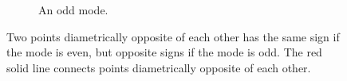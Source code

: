 \begin{figure}[h!]
\begin{subfigure}[t]{0.5\textwidth}
        \caption{An odd mode.}
    \end{subfigure}
    \caption{Two points diametrically opposite of each other has the same sign if the mode is even, but opposite signs if the mode is odd.
            The red solid line connects points diametrically opposite of each other.}
    \label{fig:BCLaplace}
\end{figure}

